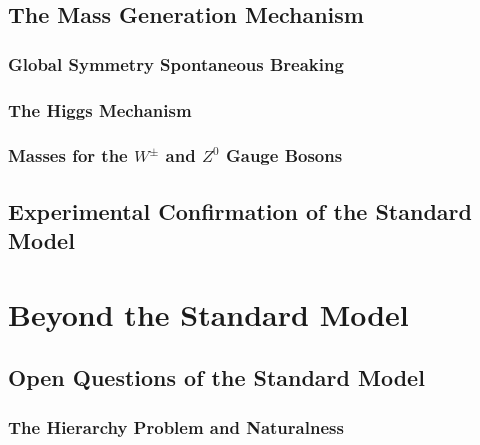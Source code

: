 \documentclass[10pt,twoside,cucitura,classica,openany]{toptesi}
\begin{document}


\section{The Mass Generation Mechanism}
\label{sec:higgs-mechanism}



\subsection{Global Symmetry Spontaneous Breaking}
\label{sec:glob-symm-break}



\subsection{The Higgs Mechanism}
\label{sec:higgs-model}



\subsection{Masses for the $W^{\pm}$ and $Z^{0}$ Gauge Bosons}
\label{sec:masses-wpm-z}



\section{Experimental Confirmation of the Standard Model}
\label{sec:exper-conf-stand}



\chapter{Beyond the Standard Model}
\label{cha:beyond-stand-model}

\section{Open Questions of the Standard Model}
\label{sec:open-quest-stand}



\subsection{The Hierarchy Problem and Naturalness}
\label{sec:hier-probl-natur}
\end{document}
